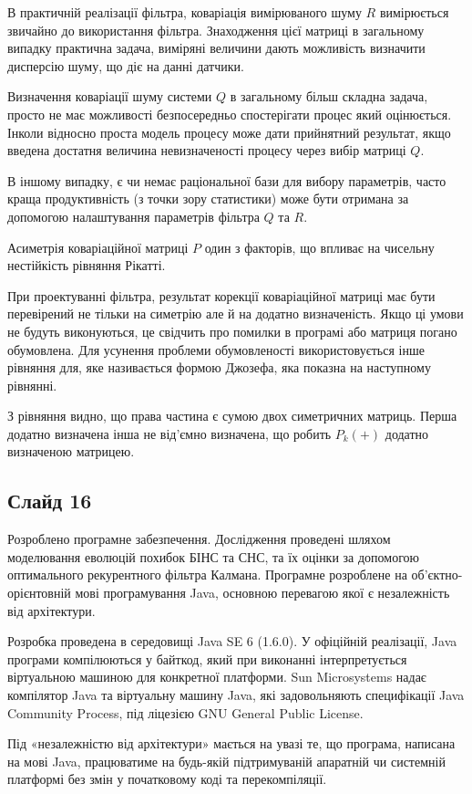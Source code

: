 \documentclass[ukrainian,utf8,simple,floatsubsection, hpadding=1mm,equationsubsection,12pt]{eskdtext}
\begin{document}
В практичній реалізації фільтра, коваріація вимірюваного шуму $R$ вимірюється
звичайно до використання фільтра. Знаходження цієї матриці в загальному випадку
практична задача, виміряні величини дають можливість визначити дисперсію шуму, що
діє на данні датчики.

Визначення коваріації шуму системи $Q$ в загальному більш складна задача,
просто не має можливості безпосередньо спостерігати процес який оцінюється.
Інколи відносно проста модель процесу може дати прийнятний результат, якщо
введена достатня величина невизначеності процесу через вибір матриці $Q$.

В іншому випадку, є чи немає раціональної бази для вибору параметрів, часто
краща продуктивність (з точки зору статистики) може бути отримана за допомогою
налаштування параметрів фільтра $Q$ та $R$. 

Асиметрія коваріаційної матриці $P$ один з факторів, що впливає на чисельну
нестійкість рівняння Рікатті. 


При проектуванні фільтра, результат корекції коваріаційної матриці  
має бути перевірений не тільки на симетрію але й на додатно визначеність.
Якщо ці умови не будуть виконуються, це свідчить про помилки в програмі або
матриця погано обумовлена. Для усунення проблеми обумовленості використовується
інше рівняння для, яке називається формою Джозефа, яка показна на
наступному рівнянні.

З рівняння видно, що права частина є сумою двох симетричних матриць.
Перша додатно визначена інша не від'ємно визначена, що робить $P_{k}(+)$ 
додатно визначеною матрицею.
\subsection*{Слайд 16}
Розроблено програмне забезпечення. Дослідження проведені шляхом моделювання еволюцій похибок БІНС та СНС, та їх оцінки за допомогою оптимального рекурентного фільтра Калмана. Програмне розроблене на об'єктно-орієнтовній мові програмування Java, основною перевагою якої є незалежність від архітектури.

Розробка проведена в середовищі Java SE 6 (1.6.0). У офіційній реалізації, Java програми компілюються у байткод, який при виконанні інтерпретується віртуальною машиною для конкретної платформи. Sun Microsystems надає компілятор Java та віртуальну машину Java, які задовольняють специфікації Java Community Process, під ліцезією GNU General Public License. 

Під «незалежністю від архітектури» мається на увазі те, що програма, написана на мові Java, працюватиме на будь-якій підтримуваній апаратній чи системній платформі без змін у початковому коді та перекомпіляції.
\end{document}
